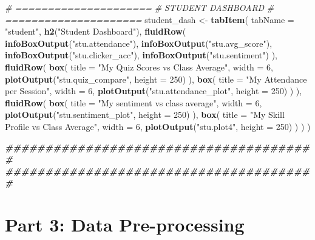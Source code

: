 \documentclass[
]{article}
\newenvironment{Shaded}{\begin{snugshade}}{\end{snugshade}}
\newcommand{\AttributeTok}[1]{\textcolor[rgb]{0.13,0.29,0.53}{#1}}
\newcommand{\CommentTok}[1]{\textcolor[rgb]{0.56,0.35,0.01}{\textit{#1}}}
\newcommand{\DecValTok}[1]{\textcolor[rgb]{0.00,0.00,0.81}{#1}}
\newcommand{\DocumentationTok}[1]{\textcolor[rgb]{0.56,0.35,0.01}{\textbf{\textit{#1}}}}
\newcommand{\FunctionTok}[1]{\textcolor[rgb]{0.13,0.29,0.53}{\textbf{#1}}}
\newcommand{\NormalTok}[1]{#1}
\newcommand{\OtherTok}[1]{\textcolor[rgb]{0.56,0.35,0.01}{#1}}
\newcommand{\StringTok}[1]{\textcolor[rgb]{0.31,0.60,0.02}{#1}}
\begin{document}
\begin{Shaded}
\begin{Highlighting}[]
\CommentTok{\# =====================}
\CommentTok{\# STUDENT DASHBOARD}
\CommentTok{\# =====================}
\NormalTok{student\_dash }\OtherTok{\textless{}{-}} \FunctionTok{tabItem}\NormalTok{(}
  \AttributeTok{tabName =} \StringTok{"student"}\NormalTok{,}
  \FunctionTok{h2}\NormalTok{(}\StringTok{"Student Dashboard"}\NormalTok{),}
  \FunctionTok{fluidRow}\NormalTok{(}
    \FunctionTok{infoBoxOutput}\NormalTok{(}\StringTok{"stu.attendance"}\NormalTok{),}
    \FunctionTok{infoBoxOutput}\NormalTok{(}\StringTok{"stu.avg\_score"}\NormalTok{),}
    \FunctionTok{infoBoxOutput}\NormalTok{(}\StringTok{"stu.clicker\_acc"}\NormalTok{),}
    \FunctionTok{infoBoxOutput}\NormalTok{(}\StringTok{"stu.sentiment"}\NormalTok{)}
\NormalTok{  ),}
  \FunctionTok{fluidRow}\NormalTok{(}
    \FunctionTok{box}\NormalTok{(}
      \AttributeTok{title =} \StringTok{"My Quiz Scores vs Class Average"}\NormalTok{, }\AttributeTok{width =} \DecValTok{6}\NormalTok{,}
      \FunctionTok{plotOutput}\NormalTok{(}\StringTok{"stu.quiz\_compare"}\NormalTok{, }\AttributeTok{height =} \DecValTok{250}\NormalTok{)}
\NormalTok{    ),}
    \FunctionTok{box}\NormalTok{(}
      \AttributeTok{title =} \StringTok{"My Attendance per Session"}\NormalTok{, }\AttributeTok{width =} \DecValTok{6}\NormalTok{,}
      \FunctionTok{plotOutput}\NormalTok{(}\StringTok{"stu.attendance\_plot"}\NormalTok{, }\AttributeTok{height =} \DecValTok{250}\NormalTok{)}
\NormalTok{    )}
\NormalTok{  ),}
  \FunctionTok{fluidRow}\NormalTok{(}
    \FunctionTok{box}\NormalTok{(}
      \AttributeTok{title =} \StringTok{"My sentiment vs class average"}\NormalTok{,}
      \AttributeTok{width =} \DecValTok{6}\NormalTok{,}
      \FunctionTok{plotOutput}\NormalTok{(}\StringTok{"stu.sentiment\_plot"}\NormalTok{, }\AttributeTok{height =} \DecValTok{250}\NormalTok{)}
\NormalTok{    ),}
    \FunctionTok{box}\NormalTok{(}
      \AttributeTok{title =} \StringTok{"My Skill Profile vs Class Average"}\NormalTok{,}
      \AttributeTok{width =} \DecValTok{6}\NormalTok{,}
      \FunctionTok{plotOutput}\NormalTok{(}\StringTok{"stu.plot4"}\NormalTok{, }\AttributeTok{height =} \DecValTok{250}\NormalTok{)}
\NormalTok{    )}
\NormalTok{  )}
\NormalTok{)}

\DocumentationTok{\#\#\#\#\#\#\#\#\#\#\#\#\#\#\#\#\#\#\#\#\#\#\#\#\#\#\#\#\#\#\#\#\#\#\#\#\#\#\#}
\DocumentationTok{\#\#\#\#\#\#\#\#\#\#\#\#\#\#\#\#\#\#\#\#\#\#\#\#\#\#\#\#\#\#\#\#\#\#\#\#\#\#\#}
\end{Highlighting}
\end{Shaded}

\section{Part 3: Data Pre-processing}\label{part-3-data-pre-processing}
\end{document}
